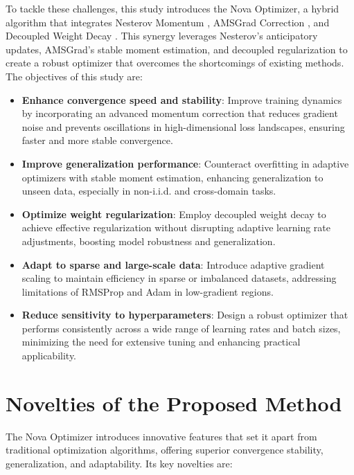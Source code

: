 \documentclass{article}
\begin{document}
To tackle these challenges, this study introduces the Nova Optimizer, a hybrid algorithm that integrates Nesterov Momentum \cite{nesterov1983method}, AMSGrad Correction \cite{Reddi2018}, and Decoupled Weight Decay \cite{Loshchilov2017}. This synergy leverages Nesterov’s anticipatory updates, AMSGrad’s stable moment estimation, and decoupled regularization to create a robust optimizer that overcomes the shortcomings of existing methods. The objectives of this study are:

\begin{itemize}
\item \textbf{Enhance convergence speed and stability}: Improve training dynamics by incorporating an advanced momentum correction that reduces gradient noise and prevents oscillations in high-dimensional loss landscapes, ensuring faster and more stable convergence.

\item \textbf{Improve generalization performance}: Counteract overfitting in adaptive optimizers with stable moment estimation, enhancing generalization to unseen data, especially in non-i.i.d. and cross-domain tasks.

\item \textbf{Optimize weight regularization}: Employ decoupled weight decay to achieve effective regularization without disrupting adaptive learning rate adjustments, boosting model robustness and generalization.

\item \textbf{Adapt to sparse and large-scale data}: Introduce adaptive gradient scaling to maintain efficiency in sparse or imbalanced datasets, addressing limitations of RMSProp and Adam in low-gradient regions.

\item \textbf{Reduce sensitivity to hyperparameters}: Design a robust optimizer that performs consistently across a wide range of learning rates and batch sizes, minimizing the need for extensive tuning and enhancing practical applicability.
\end{itemize}


\section{Novelties of the Proposed Method}\label{Sec 4}


The Nova Optimizer introduces innovative features that set it apart from traditional optimization algorithms, offering superior convergence stability, generalization, and adaptability. Its key novelties are:
\end{document}
